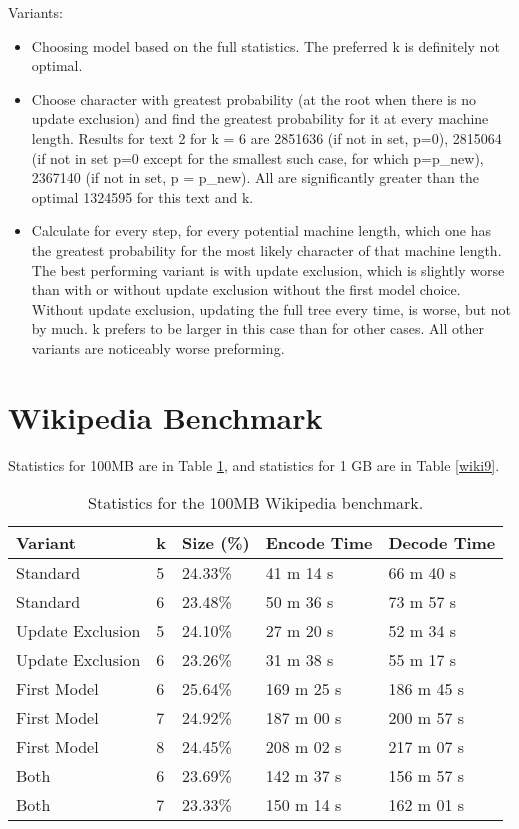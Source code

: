 \documentclass{article}
\begin{document}
Variants:
\begin{itemize}
\item Choosing model based on the full statistics. The preferred k is definitely not optimal.
\item Choose character with greatest probability (at the root when there is no update exclusion) and find the greatest probability for it at every machine length. 
Results for text 2 for k = 6 are 2851636 (if not in set, p=0), 2815064 (if not in set p=0 except for the smallest such case, for which p=p\_new), 2367140 (if not in set, p = p\_new). All are significantly greater than the optimal 1324595 for this text and k.
\item Calculate for every step, for every potential machine length, which one has the greatest probability for the most likely character of that machine length. The best performing variant is with update exclusion, which is slightly worse than with or without update exclusion without the first model choice. Without update exclusion, updating the full tree every time, is worse, but not by much. k prefers to be larger in this case than for other cases. All other variants are noticeably worse preforming. 
\end{itemize}

\section{Wikipedia Benchmark}

Statistics for 100MB are in Table \ref{wiki8}, and statistics for 1 GB are in Table \ref{wiki9}.


\begin{table}[]
\caption{Statistics for the 100MB Wikipedia benchmark.}
\label{wiki8}
\begin{center}

\begin{tabular}{|l|l|l|l|l|}
\hline
Variant          & k & Size (\%) & Encode Time & Decode Time \\ \hline
Standard         & 5 & 24.33\%   & 41 m 14 s   & 66 m 40 s   \\ \hline
Standard         & 6 & 23.48\%   & 50 m 36 s   &  73 m 57 s  \\ \hline
Update Exclusion & 5 & 24.10\%   & 27 m 20 s   &  52 m 34 s  \\ \hline
Update Exclusion & 6 & 23.26\%   & 31 m 38 s   &  55 m 17 s  \\ \hline
First Model      & 6 & 25.64\%   & 169 m 25 s  & 186 m 45 s  \\ \hline
First Model      & 7 & 24.92\%   & 187 m 00 s  & 200 m 57 s  \\ \hline
First Model      & 8 & 24.45\%   & 208 m 02 s  & 217 m 07 s  \\ \hline
Both             & 6 & 23.69\%   & 142 m 37 s  & 156 m 57 s  \\ \hline
Both             & 7 & 23.33\%   & 150 m 14 s  & 162 m 01 s  \\ \hline
\end{tabular}
\end{center}

\end{table}
\end{document}
